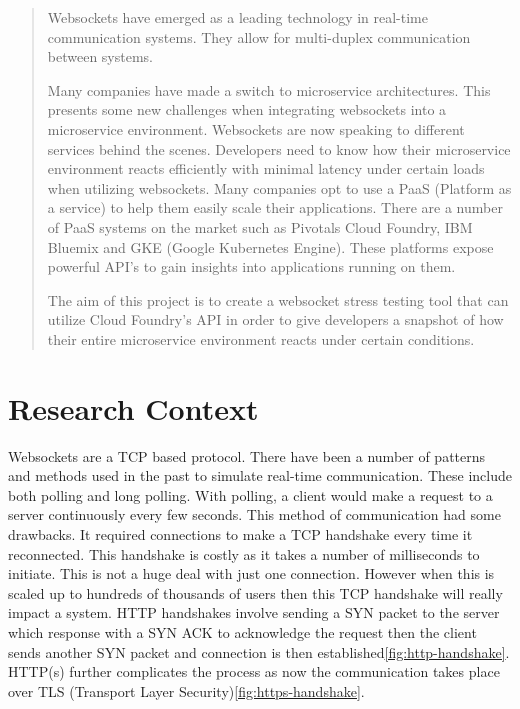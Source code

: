 \begin{abstract}

Websockets have emerged as a leading technology in real-time communication systems. They allow for multi-duplex communication between systems.

Many companies have made a switch to microservice architectures. This presents some new challenges when integrating websockets into a microservice environment. Websockets are now speaking to different services behind the scenes. Developers need to know how their microservice environment reacts efficiently with minimal latency under certain loads when utilizing websockets. Many companies opt to use a PaaS (Platform as a service) to help them easily scale their applications. There are a number of PaaS systems on the market such as Pivotals Cloud Foundry, IBM Bluemix and GKE (Google Kubernetes Engine). These platforms expose powerful API's to gain insights into applications running on them.

The aim of this project is to create a websocket stress testing tool that can utilize Cloud Foundry's API in order to give developers a snapshot of how their entire microservice environment reacts under certain conditions.

\end{abstract}

\chapter{Research Context}

Websockets are a TCP based protocol\cite{8089962}. There have been a number of patterns and methods used in the past to simulate real-time communication. These include both polling and long polling. With polling, a client would make a request to a server continuously every few seconds. This method of communication had some drawbacks. It required connections to make a TCP handshake every time it reconnected. This handshake is costly as it takes a number of milliseconds to initiate. This is not a huge deal with just one connection. However when this is scaled up to hundreds of thousands of users then this TCP handshake will really impact a system\cite{5735801}. HTTP handshakes involve sending a SYN packet to the server which response with a SYN ACK to acknowledge the request then the client sends another SYN packet and connection is then established\ref{fig:http-handshake}\cite{5735801}. HTTP(s) further complicates the process as now the communication takes place over TLS (Transport Layer Security)\ref{fig:https-handshake}. 

